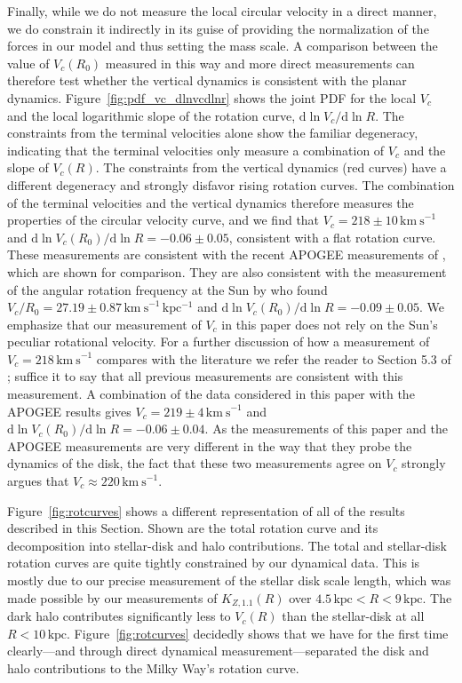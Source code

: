 \documentclass{emulateapj}
\newcommand{\dd}{\mathrm{d}}
\renewcommand{\figurename}{Figure}
\newcommand{\kpc}{\ensuremath{\,\mathrm{kpc}}}
\newcommand{\kms}{\ensuremath{\,\mathrm{km\ s}^{-1}}}
\newcommand{\inv}{\ensuremath{^{-1}}}
\newcommand{\kzoneone}{\ensuremath{K_{Z,1.1}}}
\begin{document}
Finally, while we do not measure the local circular velocity in a
direct manner, we do constrain it indirectly in its guise of providing
the normalization of the forces in our model and thus setting the mass
scale. A comparison between the value of $V_c(R_0)$ measured in this
way and more direct measurements can therefore test whether the
vertical dynamics is consistent with the planar
dynamics. \figurename~\ref{fig:pdf_vc_dlnvcdlnr} shows the joint PDF
for the local $V_c$ and the local logarithmic slope of the rotation
curve, $\dd \ln V_c / \dd \ln R$. The constraints from the terminal
velocities alone show the familiar degeneracy, indicating that the
terminal velocities only measure a combination of $V_c$ and the slope
of $V_c(R)$. The constraints from the vertical dynamics (red curves)
have a different degeneracy and strongly disfavor rising rotation
curves. The combination of the terminal velocities and the vertical
dynamics therefore measures the properties of the circular velocity
curve, and we find that $V_c = 218\pm10\kms$ and $\dd \ln V_c(R_0) /
\dd \ln R = -0.06\pm0.05$, consistent with a flat rotation
curve. These measurements are consistent with the recent APOGEE
measurements of \citet{BovyVc}, which are shown for comparison. They
are also consistent with the measurement of the angular rotation
frequency at the Sun by \citet{Feast97a} who found $V_c / R_0 =
27.19\pm0.87\kms\kpc\inv$ and $\dd \ln V_c(R_0) / \dd \ln R =
-0.09\pm0.05$. We emphasize that our measurement of $V_c$ in this
paper does not rely on the Sun's peculiar rotational velocity. For a
further discussion of how a measurement of $V_c = 218\kms$ compares
with the literature we refer the reader to Section 5.3 of
\citet{BovyVc}; suffice it to say that all previous measurements are
consistent with this measurement. A combination of the data considered
in this paper with the APOGEE results gives $V_c = 219\pm4\kms$ and
$\dd \ln V_c(R_0) / \dd \ln R= -0.06 \pm 0.04$. As the measurements of
this paper and the APOGEE measurements are very different in the way
that they probe the dynamics of the disk, the fact that these two
measurements agree on $V_c$ strongly argues that $V_c \approx
220\kms$.

\figurename~\ref{fig:rotcurves} shows a different representation of
all of the results described in this Section. Shown are the total
rotation curve and its decomposition into stellar-disk and halo
contributions. The total and stellar-disk rotation curves are quite
tightly constrained by our dynamical data. This is mostly due to our
precise measurement of the stellar disk scale length, which was made
possible by our measurements of $\kzoneone(R)$ over $4.5\kpc < R <
9\kpc$. The dark halo contributes significantly less to $V_c(R)$ than
the stellar-disk at all $R < 10\kpc$. \figurename~\ref{fig:rotcurves}
decidedly shows that we have for the first time clearly---and through
direct dynamical measurement---separated the disk and halo
contributions to the Milky Way's rotation curve.
\end{document}
